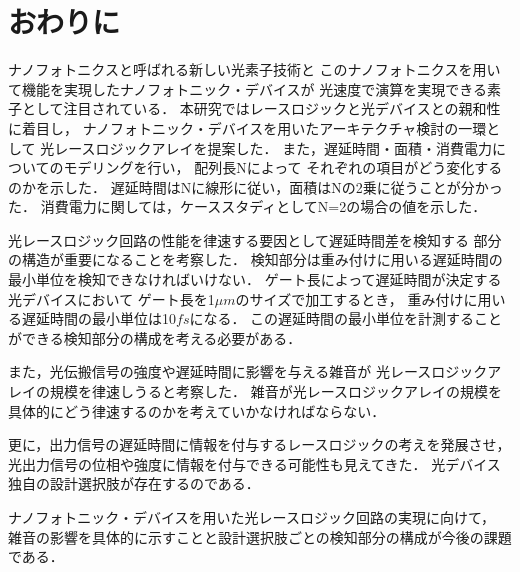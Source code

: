 \chapter{おわりに}

ナノフォトニクスと呼ばれる新しい光素子技術と
このナノフォトニクスを用いて機能を実現したナノフォトニック・デバイスが
光速度で演算を実現できる素子として注目されている．
本研究ではレースロジックと光デバイスとの親和性に着目し，
ナノフォトニック・デバイスを用いたアーキテクチャ検討の一環として
光レースロジックアレイを提案した．
また，遅延時間・面積・消費電力についてのモデリングを行い，
配列長Nによって
それぞれの項目がどう変化するのかを示した．
遅延時間はNに線形に従い，面積はNの2乗に従うことが分かった．
消費電力に関しては，ケーススタディとしてN=2の場合の値を示した．

光レースロジック回路の性能を律速する要因として遅延時間差を検知する
部分の構造が重要になることを考察した．
検知部分は重み付けに用いる遅延時間の最小単位を検知できなければいけない．
ゲート長によって遅延時間が決定する光デバイスにおいて
ゲート長を1$\mu m$のサイズで加工するとき，
重み付けに用いる遅延時間の最小単位は10$fs$になる．
この遅延時間の最小単位を計測することができる検知部分の構成を考える必要がある．

また，光伝搬信号の強度や遅延時間に影響を与える雑音が
光レースロジックアレイの規模を律速しうると考察した．
雑音が光レースロジックアレイの規模を具体的にどう律速するのかを考えていかなければならない．

更に，出力信号の遅延時間に情報を付与するレースロジックの考えを発展させ，
光出力信号の位相や強度に情報を付与できる可能性も見えてきた．
光デバイス独自の設計選択肢が存在するのである．

ナノフォトニック・デバイスを用いた光レースロジック回路の実現に向けて，
雑音の影響を具体的に示すことと設計選択肢ごとの検知部分の構成が今後の課題である．

